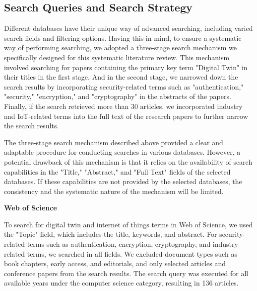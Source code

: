 \subsection{Search Queries and Search Strategy}
Different databases have their unique way of advanced searching, including varied search fields and filtering options. Having this in mind, to ensure a systematic way of performing searching, we adopted a three-stage search mechanism we specifically designed for this systematic literature review. This mechanism involved searching for papers containing the primary key term "Digital Twin" in their titles in the first stage. And in the second stage, we narrowed down the search results by incorporating security-related terms such as "authentication," "security," "encryption," and "cryptography" in the abstracts of the papers. Finally, if the search retrieved more than 30 articles, we incorporated industry and IoT-related terms into the full text of the research papers to further narrow the search results.


The three-stage search mechanism described above provided a clear and adaptable procedure for conducting searches in various databases. However, a potential drawback of this mechanism is that it relies on the availability of search capabilities in the "Title," "Abstract," and "Full Text" fields of the selected databases. If these capabilities are not provided by the selected databases, the consistency and the systematic nature of the mechanism will be limited.


\textbf{Web of Science}

To search for digital twin and internet of things terms in Web of Science, we used the "Topic" field, which includes the title, keywords, and abstract. For security-related terms such as authentication, encryption, cryptography, and industry-related terms, we searched in all fields. We excluded document types such as book chapters, early access, and editorials, and only selected articles and conference papers from the search results. The search query was executed for all available years under the computer science category, resulting in 136 articles.

